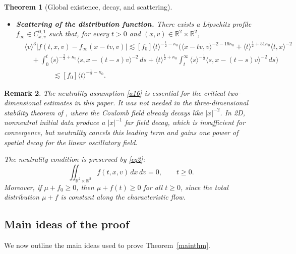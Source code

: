 \documentclass[reqno,11pt]{amsart}
\numberwithin{equation}{section}
\def\R{{\mathbb R}}
\def\R{{\bf R}}
\def\R{\mathbb{R}}
\newtheorem{theorem}{Theorem}[section]
\newtheorem{remark}[theorem]{Remark}
\begin{document}
\begin{theorem}[Global existence, decay, and scattering]
\begin{itemize}
		\item \textbf{Scattering of the distribution function.}
		There exists a Lipschitz profile
		$f_\infty\in C^{0,1}_{x,v}$ such that, for every $t>0$ and
		$(x,v)\in\mathbb R^2\times\mathbb R^2$,
		\begin{equation}\label{po}
			\begin{split}
				&\langle v\rangle^{3}\left|	f(t,x,v)- 	f_\infty(x-tv,v)\right|
				\lesssim [f_0]\langle t\rangle^{-\frac12-\kappa_0}\Big(
				\langle x-tv,v\rangle^{-2-19\kappa_0}
				+\langle t\rangle^{\frac12+51\kappa_0}\langle t,x\rangle^{-2}\\
				&\quad+\int_0^t\langle s\rangle^{-\frac23+\kappa_0}
				\langle s,x-(t-s)v\rangle^{-2}\,ds+\langle t\rangle^{\frac12+\kappa_0}
				\int_t^\infty\langle s\rangle^{-\frac12}
				\langle s,x-(t-s)v\rangle^{-2}\,ds\Big)\\
				&\qquad\qquad\lesssim [f_0]\langle t\rangle^{-\frac12-\kappa_0}.
			\end{split}
		\end{equation}
	\end{itemize}
\end{theorem}

\begin{remark}
	The neutrality assumption \eqref{a16} is essential for the critical
	two-dimensional estimates in this paper. It was not needed in the
	three-dimensional stability theorem of \cite{AIonescu2022}, where
	the Coulomb field already decays like $|x|^{-2}$. In 2D, nonneutral initial data produce a $|x|^{-1}$ far field decay, which is insufficient for convergence, but neutrality cancels this leading term and gains one power of spatial
	decay for the linear
	oscillatory field.
	
	The neutrality condition is preserved by \eqref{eq2}:
	\begin{equation}\label{a17}
		\iint_{\R^2\times\R^2}f(t,x,v)\,dx\,dv=0,\qquad t\ge0.
	\end{equation}
	Moreover, if $\mu+f_0\ge0$, then $\mu+f(t)\ge0$ for all $t\ge0$,
	since the total distribution $\mu+f$ is constant along the
	characteristic flow.
\end{remark}

\subsection{Main ideas of the proof}
We now outline the main ideas used to prove Theorem~\ref{mainthm}.
\end{document}

